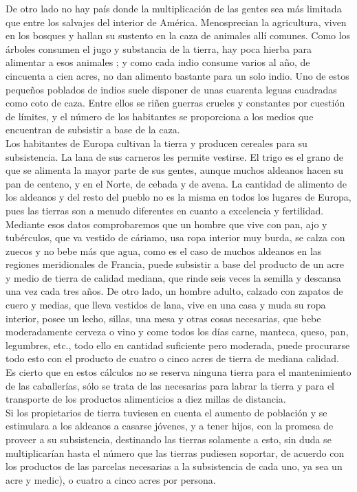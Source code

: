 \documentclass[10pt]{article}
\begin{document}
\begin{multicols}{1}
De otro lado no hay país donde la multiplicación de las gentes sea más limitada que entre los salvajes del interior de América. Menosprecian la agricultura, viven en los bosques y hallan su sustento en la caza de animales allí comunes. Como los árboles consumen el jugo y substancia de la tierra, hay poca hierba para alimentar a esos animales ; y como cada indio consume varios al año, de cincuenta a cien acres, no dan alimento bastante para un solo indio. Uno de estos pequeños poblados de indios suele disponer de unas cuarenta leguas cuadradas como coto de caza. Entre ellos se riñen guerras crueles y constantes por cuestión de límites, y el número de los habitantes se proporciona a los medios que encuentran de subsistir a base de la caza.\\
Los habitantes de Europa cultivan la tierra y producen cereales para su subsistencia. La lana de sus carneros les permite vestirse. El trigo es el grano de que se alimenta la mayor parte de sus gentes, aunque muchos aldeanos hacen su pan de centeno, y en el Norte, de cebada y de avena. La cantidad de alimento de los aldeanos y del resto del pueblo no es la misma en todos los lugares de Europa, pues las tierras son a menudo diferentes en cuanto a excelencia y fertilidad.\\
Mediante esos datos comprobaremos que un hombre que vive con pan, ajo y tubérculos, que va vestido de cáriamo, usa ropa interior muy burda, se calza con zuecos y no bebe más que agua, como es el caso de muchos aldeanos en las regiones meridionales de Francia, puede subsistir a base del producto de un acre y medio de tierra de calidad mediana, que rinde seis veces la semilla y descansa una vez cada tres años. De otro lado, un hombre adulto, calzado con zapatos de cuero y medias, que lleva vestidos de lana, vive en una casa y muda su ropa interior, posee un lecho, sillas, una mesa y otras cosas necesarias, que bebe moderadamente cerveza o vino y come todos los días carne, manteca, queso, pan, legumbres, etc., todo ello en cantidad suficiente pero moderada, puede procurarse todo esto con el producto de cuatro o cinco acres de tierra de mediana calidad. Es cierto que en estos cálculos no se reserva ninguna tierra para el mantenimiento de las caballerías, sólo se trata de las necesarias para labrar la tierra y para el transporte de los productos alimenticios a diez millas de distancia.\\
Si los propietarios de tierra tuviesen en cuenta el aumento de población y se estimulara a los aldeanos a casarse jóvenes, y a tener hijos, con la promesa de proveer a su subsistencia, destinando las tierras solamente a esto, sin duda se multiplicarían hasta el número que las tierras pudiesen soportar, de acuerdo con los productos de las parcelas necesarias a la subsistencia de cada uno, ya sea un acre y medic), o cuatro a cinco acres por persona.\\

\end{multicols}
\end{document}

